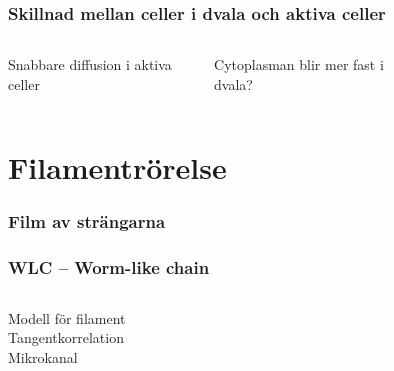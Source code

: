 \documentclass[swedish]{beamer}
\begin{document}
\begin{frame}
\frametitle{Skillnad mellan celler i dvala och aktiva celler}
\begin{columns}


Snabbare diffusion i aktiva celler
\vspace{1cm}

Cytoplasman blir mer fast i dvala?




\begin{figure} %
\resizebox{1\textwidth}{!}{
}
\end{figure}

\end{columns}
\end{frame}


\section{Filamentrörelse}

\begin{frame}
\frametitle{Film av strängarna}

\centering
{}


\end{frame}




\begin{frame}
\frametitle{WLC -- Worm-like chain}
 \begin{columns}[c]

 Modell för filament
\\[8mm]
 Tangentkorrelation
\\[8mm]
 Mikrokanal


\begin{figure}

\end{figure}

\end{columns}
    
\end{frame}
\end{document}
